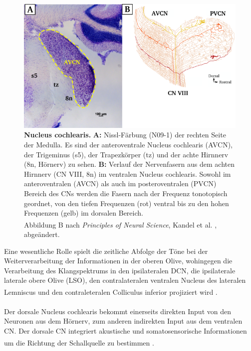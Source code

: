 \documentclass[12pt,a4paper,pdftex]{article}
\begin{document}
\begin{figure}[H]
    \centering
    \includegraphics[width = \textwidth]{pictures/auditory/CN.png}
    \caption[Nucleus cochlearis]{\textbf{Nucleus cochlearis.} \textbf{A:} Nissl-Färbung (N09-1) der rechten Seite der Medulla. Es sind der anteroventrale Nucleus cochlearis (AVCN), der Trigeminus (s5), der Trapezkörper (tz) und der achte Hirnnerv (8n, Hörnerv) zu sehen. \textbf{B:} Verlauf der Nervenfasern aus dem achten Hirnnerv (CN VIII, 8n) im ventralen Nucleus cochlearis. Sowohl im anteroventralen (AVCN) als auch im posteroventralen (PVCN) Bereich des CNs werden die Fasern nach der Frequenz tonotopisch geordnet, von den tiefen Frequenzen (rot) ventral bis zu den hohen Frequenzen (gelb) im dorsalen Bereich. \\
    Abbildung B nach \textit{Principles of Neural Science}, Kandel et al. \textsuperscript{\cite[31]{kandel2013principles}}, abgeändert.}
    \label{fig:Nucleus_cochlearis}
\end{figure}

\newpage
Eine wesentliche Rolle spielt die zeitliche Abfolge der Töne bei der Weiterverarbeitung der Informationen in der oberen Olive, wohingegen die Verarbeitung des Klangspektrums in den ipsilateralen DCN, die ipsilaterale laterale obere Olive (LSO), den contralateralen ventralen Nucleus des lateralen Lemniscus und den contraleteralen Colliculus inferior projiziert wird \textsuperscript{\cite[31]{kandel2013principles}}. 
\\\\
\noindent Der dorsale Nucleus cochlearis bekommt einerseits direkten Input von den Neuronen aus dem Hörnerv, zum anderen indirekten Input aus dem ventralen CN. Der dorsale CN integriert akustische und somatosensorische Informationen um die Richtung der Schallquelle zu bestimmen \textsuperscript{\cite[31]{kandel2013principles}}. 
\end{document}
